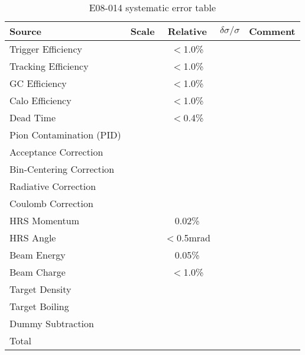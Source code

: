 \documentclass[a4paper,12.pt]{article}
\begin{document}
 \begin{table}[htbp]
 \centering
    \begin{tabular}{|l|c|c|c|c|}
    \hline
     Source               & Scale & Relative & $\delta\sigma/\sigma$& Comment   \\[6pt]
  \hline
    \hline
    Trigger Efficiency    &      &     $<$1.0\%  &                      &          \\[7pt] \hline
    Tracking Efficiency   &      &     $<$1.0\%  &                      &          \\[7pt] \hline
    GC Efficiency         &      &     $<$1.0\%  &                      &          \\[7pt] \hline
    Calo Efficiency       &      &     $<$1.0\%  &                      &          \\[7pt] \hline
     Dead Time             &      &     $<$0.4\%     &                      &      \\[7pt] \hline
    Pion Contamination (PID)    &      &          &                      &          \\[7pt] 
    \hline
    \hline
    Acceptance Correction       &      &          &                      &          \\[7pt] \hline
    Bin-Centering Correction    &      &          &                      &          \\[7pt] \hline
    Radiative Correction        &      &          &                      &          \\[7pt] \hline
    Coulomb Correction          &      &          &                      &          \\[7pt]
    \hline
    \hline
    HRS Momentum         &      &   0.02\%      &                      &          \\[7pt] \hline
    HRS Angle            &      &   $<$0.5mrad  &                      &          \\[7pt] \hline
    Beam Energy          &      &   0.05\%      &                      &          \\[7pt] \hline
    Beam Charge          &      &   $<$1.0\%    &                      &          \\[7pt] 
   \hline
    \hline
    Target Density       &      &          &                      &          \\[7pt] \hline
    Target Boiling       &      &          &                      &          \\[7pt] \hline
    Dummy Subtraction    &      &          &                      &          \\[7pt] 
    \hline
    \hline
    Total               &       &          &                      &          \\[7pt]
    \hline
    \end{tabular}
      \caption{E08-014 systematic error table}
  \label{sys_table}
  \end{table}
   
\end{document}
